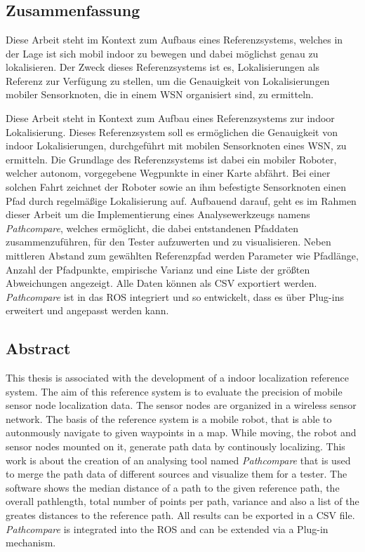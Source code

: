 \chapter*{\abstractname}
\section*{Zusammenfassung} Diese Arbeit steht im Kontext zum Aufbaus eines
Referenzsystems, welches in der Lage ist sich mobil indoor zu bewegen und dabei
möglichst genau zu lokalisieren.  Der Zweck dieses Referenzsystems ist es,
Lokalisierungen als Referenz zur Verfügung zu stellen, um die Genauigkeit von
Lokalisierungen mobiler Sensorknoten, die in einem 
\gls{WSN} organisiert sind, zu ermitteln. 

Diese Arbeit steht in Kontext zum Aufbau eines Referenzsystems zur indoor
Lokalisierung. Dieses Referenzsystem soll es ermöglichen die Genauigkeit von
indoor Lokalisierungen, durchgeführt mit mobilen Sensorknoten eines \gls{WSN},
zu ermitteln. Die Grundlage des Referenzsystems ist dabei ein mobiler Roboter,
welcher autonom, vorgegebene Wegpunkte in einer Karte abfährt. Bei einer solchen
Fahrt zeichnet der Roboter sowie an ihm befestigte Sensorknoten einen Pfad
durch regelmäßige Lokalisierung auf. Aufbauend darauf, geht es im Rahmen dieser
Arbeit um die Implementierung eines Analysewerkzeugs namens
\textit{Pathcompare}, welches ermöglicht, die dabei entstandenen Pfaddaten
zusammenzuführen, für den Tester aufzuwerten und zu visualisieren. Neben
mittleren Abstand zum gewählten Referenzpfad werden Parameter wie
Pfadlänge, Anzahl der Pfadpunkte, empirische Varianz und eine Liste der größten
Abweichungen angezeigt. Alle Daten können als \gls{CSV} exportiert werden.
\textit{Pathcompare} ist in das \gls{ROS} integriert und so entwickelt, dass es
über Plug-ins erweitert und angepasst werden kann. 


\section*{Abstract} This thesis is associated with the development of a indoor
localization reference system. The aim of this reference system is to evaluate
the precision of mobile sensor node localization data. The sensor nodes are
organized in a wireless sensor network. The basis of the reference system is a
mobile robot, that is able to autonmously navigate to given waypoints in a map.
While moving, the robot and sensor nodes mounted on it, generate path data by
continously localizing. This work is about the creation of an analysing tool
named \textit{Pathcompare} that is used to merge the path data of different
sources and visualize them for a tester. The software shows the median distance
of a path to the given reference path, the overall pathlength, total number of
points per path, variance and also a list of the greates distances to the
reference path.  All results can be exported in a \gls{CSV} file.
\textit{Pathcompare} is integrated into the \gls{ROS} and can be extended via a
Plug-in mechanism.
